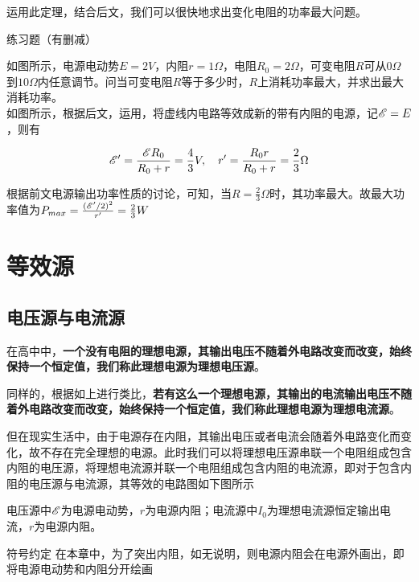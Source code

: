 运用此定理，结合后文，我们可以很快地求出变化电阻的功率最大问题。

\begin{ep}{练习题（有删减）}{}

如图所示，电源电动势$E=2V$，内阻$r=1\Omega$，电阻$R_0=2\Omega$，可变电阻$R$可从$0\Omega$到$10\Omega$内任意调节。问当可变电阻$R$等于多少时，$R$上消耗功率最大，并求出最大消耗功率。
~\\


如图所示，根据后文，运用，将虚线内电路等效成新的带有内阻的电源，记$\mathscr{E} = E$，则有

$$\mathscr{E}^{\prime} = \frac{\mathscr{E} R_0}{R_0 + r} = \frac{4}{3} V ,\quad r^{\prime} = \frac{R_0 r}{R_0 + r} = \frac{2}{3} \Omega$$

根据前文电源输出功率性质的讨论，可知，当$R=\frac{2}{3} \Omega$时，其功率最大。故最大功率值为$P_{max} = \frac{(\mathscr{E}^{\prime} / 2)^2}{r^{\prime}} = \frac{2}{3} W$

\end{ep}

\section{等效源}
\label{s_dxy}

\subsection{电压源与电流源\quad \dag}

在高中中，\textbf{一个没有电阻的理想电源，其输出电压不随着外电路改变而改变，始终保持一个恒定值，我们称此理想电源为理想电压源}。

同样的，根据如上进行类比，\textbf{若有这么一个理想电源，其输出的电流输出电压不随着外电路改变而改变，始终保持一个恒定值，我们称此理想电源为理想电流源}。

但在现实生活中，由于电源存在内阻，其输出电压或者电流会随着外电路变化而变化，故不存在完全理想的电源。此时我们可以将理想电压源串联一个电阻组成包含内阻的电压源，将理想电流源并联一个电阻组成包含内阻的电流源，即对于包含内阻的电压源与电流源，其等效的电路图如下图所示



电压源中$\mathscr{E}$为电源电动势，$r$为电源内阻；电流源中$I_0$为理想电流源恒定输出电流，$r$为电源内阻。

\begin{mk}{符号约定}{}
在本章中，为了突出内阻，如无说明，则电源内阻会在电源外画出，即将电源电动势和内阻分开绘画
\end{mk}

